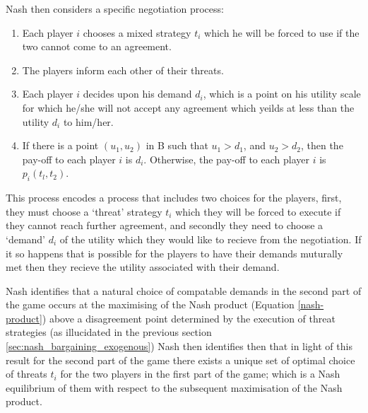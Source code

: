 Nash then considers a specific negotiation process:
\begin{enumerate}
\item Each player $i$ chooses a mixed strategy $t_i$ which he will be forced to use if the two cannot come to an agreement.
\item The players inform each other of their threats.
\item Each player $i$ decides upon his demand $d_i$, which is a point on his utility scale for which he/she will not accept any agreement which yeilds at less than the utility $d_i$ to him/her.
\item If there is a point $(u_1,u_2)$ in B such that $u_1 > d_1$, and $u_2 > d_2$, then the pay-off to each player $i$ is $d_i$. Otherwise, the pay-off to each player $i$ is $p_i(t_l, t_2)$.
\end{enumerate}

This process encodes a process that includes two choices for the players, first, they must choose a `threat' strategy $t_i$ which they will be forced to execute if they cannot reach further agreement, and secondly they need to choose a `demand' $d_i$ of the utility which they would like to recieve from the negotiation.
If it so happens that is possible for the players to have their demands muturally met then they recieve the utility associated with their demand.

Nash identifies that a natural choice of compatable demands in the second part of the game occurs at the maximising of the Nash product (Equation \ref{nash-product}) above a disagreement point determined by the execution of threat strategies (as illucidated in the previous section \ref{sec:nash_bargaining_exogenous})
Nash then identifies then that in light of this result for the second part of the game there exists a unique set of optimal choice of threats $t_i$ for the two players in the first part of the game; which is a Nash equilibrium of them with respect to the subsequent maximisation of the Nash product.

